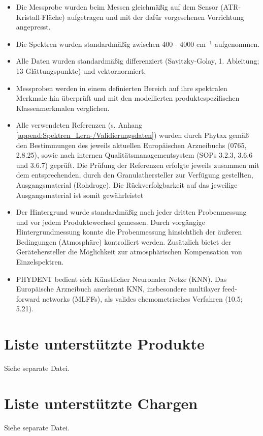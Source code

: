 \documentclass[11pt, a4paper]{article}
\newcommand\VersionPhEur{10.5}
\begin{document}
\begin{itemize}
\item Die Messprobe wurden beim Messen gleichmäßig auf dem Sensor (ATR-Kristall-Fläche) aufgetragen und mit der dafür vorgesehenen Vorrichtung angepresst.
\item Die Spektren wurden standardmäßig zwischen 400 - 4000 cm$^{-1}$ aufgenommen.
\item Alle Daten wurden standardmäßig differenziert (Savitzky-Golay, 1. Ableitung; 13 Glättungspunkte) und vektornormiert.
\item Messproben werden in einem definierten Bereich auf ihre spektralen Merkmale hin überprüft und mit den modellierten produktespezifischen Klassenmerkmalen verglichen.
\item Alle verwendeten Referenzen (s. Anhang \ref{append:Spektren_Lern-/Validierungsdaten}) wurden durch Phytax gemäß den Bestimmungen des jeweils aktuellen Europäischen Arzneibuchs (0765, 2.8.25), sowie nach internen Qualitätsmanagementsystem (SOPs 3.2.3, 3.6.6 und 3.6.7) geprüft. Die Prüfung der Referenzen erfolgte jeweils zusammen mit dem entsprechenden, durch den Granulathersteller zur Verfügung gestellten, Ausgangsmaterial (Rohdroge). Die Rückverfolgbarkeit auf das jeweilige Ausgangsmaterial ist somit gewährleistet
\item Der Hintergrund wurde standardmäßig nach jeder dritten Probenmessung und vor jedem Produktewechsel gemessen. Durch vorgängige Hintergrundmessung konnte die Probenmessung hinsichtlich der äußeren Bedingungen (Atmosphäre) kontrolliert werden. Zusätzlich bietet der Gerätehersteller die Möglichkeit zur atmosphärischen Kompensation von Einzelspektren.
\item PHYDENT bedient sich Künstlicher Neuronaler Netze (KNN). Das Europäische Arzneibuch anerkennt KNN, insbesondere multilayer feed-forward networks (MLFFs), als valides chemometrisches Verfahren (\VersionPhEur; 5.21).
\end{itemize}

\section{Liste unterstützte Produkte}
\label{append:Liste_ unterstützte_Produkte}
Siehe separate Datei.

\section{Liste unterstützte Chargen}
\label{append:Liste_unterstützte_Chargen}
Siehe separate Datei.
\end{document}
